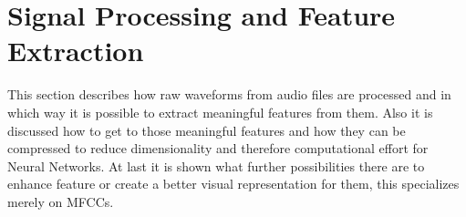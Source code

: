 
\chapter{Signal Processing and Feature Extraction}\label{sec:signal}
This section describes how raw waveforms from audio files are processed and in which way it is possible to extract meaningful features from them.
Also it is discussed how to get to those meaningful features and how they can be compressed to reduce dimensionality and therefore computational effort for Neural Networks.
At last it is shown what further possibilities there are to enhance feature or create a better visual representation for them, this specializes merely on MFCCs.




